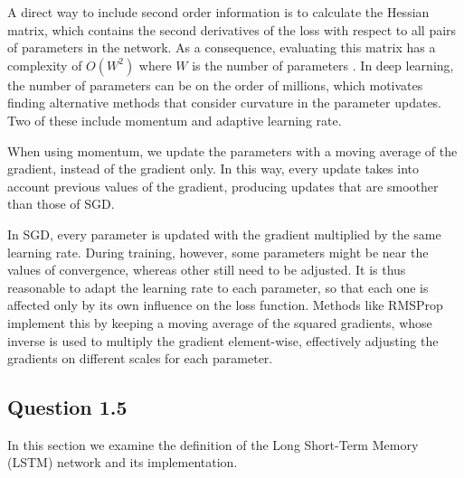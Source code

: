 \documentclass{article}
\begin{document}
A direct way to include second order information is to calculate the Hessian matrix, which contains the second derivatives of the loss with respect to all pairs of parameters in the network. As a consequence, evaluating this matrix has a complexity of $O(W^2)$ where $W$ is the number of parameters \cite{bishop2006pattern}. In deep learning, the number of parameters can be on the order of millions, which motivates finding alternative methods that consider curvature in the parameter updates. Two of these include momentum and adaptive learning rate.

When using momentum, we update the parameters with a moving average of the gradient, instead of the gradient only. In this way, every update takes into account previous values of the gradient, producing updates that are smoother than those of SGD.

In SGD, every parameter is updated with the gradient multiplied by the same learning rate. During training, however, some parameters might be near the values of convergence, whereas other still need to be adjusted. It is thus reasonable to adapt the learning rate to each parameter, so that each one is affected only by its own influence on the loss function. Methods like RMSProp implement this by keeping a moving average of the squared gradients, whose inverse is used to multiply the gradient element-wise, effectively adjusting the gradients on different scales for each parameter.

\subsection*{Question 1.5}

In this section we examine the definition of the Long Short-Term Memory (LSTM) network \cite{hochreiter1997lstm} and its implementation.
\end{document}
